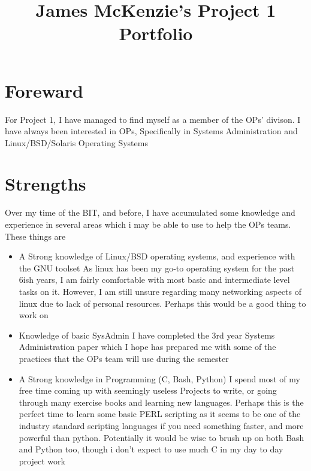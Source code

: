 \documentclass{article}
\begin{document}
\title{James McKenzie's Project 1 Portfolio}
\date{}
\maketitle


\section*{Foreward}
For Project 1, I have managed to find myself as a member of the OPs' divison. I have always been interested in OPs, Specifically in Systems Administration and Linux/BSD/Solaris Operating Systems
\section*{Strengths}
Over my time of the BIT, and before, I have accumulated some knowledge and experience in several areas which i may be able to use to help the OPs teams. These things are
\begin{itemize}
\item A Strong knowledge of Linux/BSD operating systems, and experience with the GNU toolset\newline
	As linux has been my go-to operating system for the past 6ish years, I am fairly comfortable with most basic and intermediate level tasks on it. However, I am still unsure regarding many networking aspects of linux due to lack of personal resources. Perhaps this would be a good thing to work on
\item Knowledge of basic SysAdmin\newline 
	I have completed the 3rd year Systems Administration paper which I hope has prepared me with some of the practices that the OPs team will use during the semester
\item A Strong knowledge in Programming (C, Bash, Python) \newline
	I spend most of my free time coming up with seemingly useless Projects to write, or going through many exercise books and learning new languages. Perhaps this is the perfect time to learn some basic PERL scripting as it seems to be one of the industry standard scripting languages if you need something faster, and more powerful than python. Potentially it would be wise to brush up on both Bash and Python too, though i don't expect to use much C in my day to day project work
\end{itemize}
\end{document}

